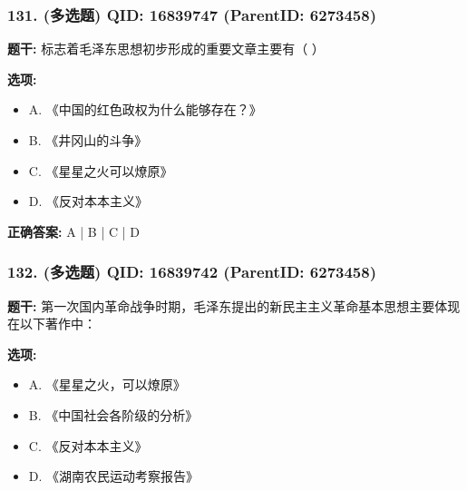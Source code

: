 \documentclass[12pt,UTF8]{ctexart}
\begin{document}
\vspace{0.3em}\hrulefill\vspace{0.7em}

\subsubsection*{131. (多选题) \small QID: 16839747 (ParentID: 6273458)}

\textbf{题干:}
标志着毛泽东思想初步形成的重要文章主要有（ ）



\textbf{选项:}
\begin{itemize}[leftmargin=*]

  \item A. 《中国的红色政权为什么能够存在？》

  \item B. 《井冈山的斗争》

  \item C. 《星星之火可以燎原》

  \item D. 《反对本本主义》

\end{itemize}

\textbf{正确答案:}
A | B | C | D

\vspace{0.3em}\hrulefill\vspace{0.7em}

\subsubsection*{132. (多选题) \small QID: 16839742 (ParentID: 6273458)}

\textbf{题干:}
第一次国内革命战争时期，毛泽东提出的新民主主义革命基本思想主要体现在以下著作中：



\textbf{选项:}
\begin{itemize}[leftmargin=*]

  \item A. 《星星之火，可以燎原》

  \item B. 《中国社会各阶级的分析》

  \item C. 《反对本本主义》

  \item D. 《湖南农民运动考察报告》

\end{itemize}
\end{document}
